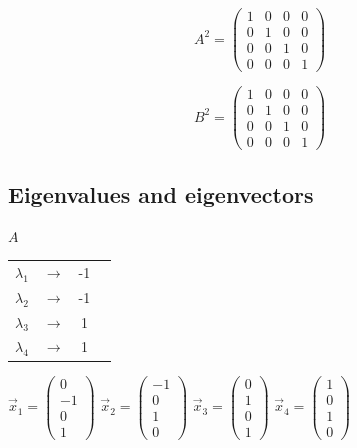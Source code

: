 \documentclass[12pt]{scrreprt}
\begin{document}
\[ A^2 = \left( \begin{array}{ccccc}
1 & 0 & 0 & 0 \\
0 & 1 & 0 & 0 \\
0 & 0 & 1 & 0 \\
0 & 0 & 0 & 1 \end{array} \right)\] 

\[ B^2 = \left( \begin{array}{ccccc}
1 & 0 & 0 & 0 \\
0 & 1 & 0 & 0 \\
0 & 0 & 1 & 0 \\
0 & 0 & 0 & 1 \end{array} \right)\] 

\subsection{Eigenvalues and eigenvectors}

  \begin{center}
  \textbf{$A$}
  \end{center}

  \begin{center}
  \begin{tabular}{ c c c p{5cm} }
    $\lambda_1$ & $\rightarrow$ & -1 \\        
    $\lambda_2$ & $\rightarrow$ & -1 \\
    $\lambda_3$ & $\rightarrow$ &  1 \\
    $\lambda_4$ & $\rightarrow$ &  1 \\
  \end{tabular}
  \end{center}

  \begin{center}
  $\vec{x}_1 = \begin{pmatrix}0\\ -1 \\ 0 \\ 1 \end{pmatrix}$
  $\vec{x}_2 = \begin{pmatrix}-1\\ 0 \\ 1 \\ 0 \end{pmatrix}$
  $\vec{x}_3 = \begin{pmatrix}0\\ 1 \\ 0 \\ 1 \end{pmatrix}$
  $\vec{x}_4 = \begin{pmatrix}1\\ 0 \\ 1 \\ 0 \end{pmatrix}$
  \end{center}
\end{document}
